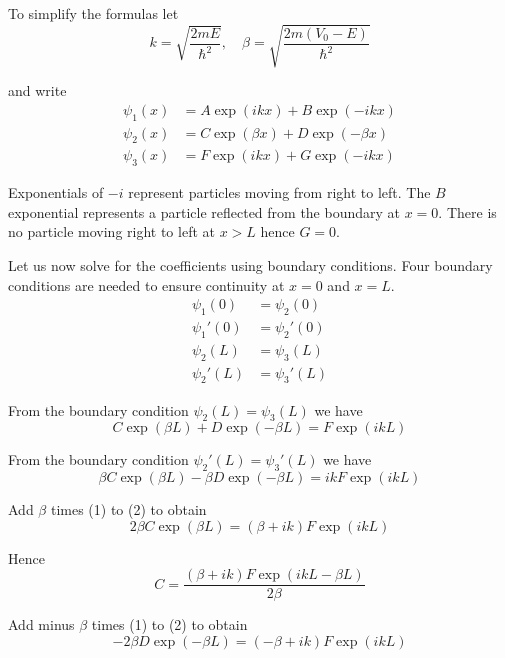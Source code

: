 To simplify the formulas let
\begin{equation*}
k=\sqrt{\frac{2mE}{\hbar^2}},\quad\beta=\sqrt{\frac{2m(V_0-E)}{\hbar^2}}
\end{equation*}

and write
\begin{align*}
\psi_1(x)&=A\exp(ikx)+B\exp(-ikx)
\\
\psi_2(x)&=C\exp(\beta x)+D\exp(-\beta x)
\\
\psi_3(x)&=F\exp(ikx)+G\exp(-ikx)
\end{align*}

Exponentials of $-i$ represent particles moving from right to left.
The $B$ exponential represents a particle reflected from the
boundary at $x=0$.
There is no particle moving right to left at $x>L$ hence $G=0$.

\bigskip
Let us now solve for the coefficients using boundary conditions.
Four boundary conditions are needed to ensure continuity
at $x=0$ and $x=L$.
\begin{align*}
\psi_1(0)&=\psi_2(0)
\\
\psi_1'(0)&=\psi_2'(0)
\\
\psi_2(L)&=\psi_3(L)
\\
\psi_2'(L)&=\psi_3'(L)
\end{align*}

From the boundary condition $\psi_2(L)=\psi_3(L)$ we have
\begin{equation*}
C\exp(\beta L)+D\exp(-\beta L)=F\exp(ikL)
\tag{1}
\end{equation*}

From the boundary condition $\psi_2'(L)=\psi_3'(L)$ we have
\begin{equation*}
\beta C\exp(\beta L)-\beta D\exp(-\beta L)
=ikF\exp(ikL)
\tag{2}
\end{equation*}

Add $\beta$ times (1) to (2) to obtain
\begin{equation*}
2\beta C\exp(\beta L)=(\beta+ik)F\exp(ikL)
\end{equation*}

Hence
\begin{equation*}
C=\frac{(\beta+ik)F\exp(ikL-\beta L)}{2\beta}
\tag{3}
\end{equation*}

Add minus $\beta$ times (1) to (2) to obtain
\begin{equation*}
-2\beta D\exp(-\beta L)=(-\beta+ik)F\exp(ikL)
\end{equation*}

